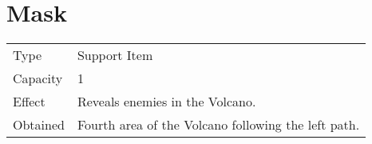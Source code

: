 \section{Mask}
\label{item:mask}


\noindent\begin{tabularx}{\textwidth}[l]{lX}
	Type
	& Support Item
\\ %
	Capacity
	& 1
\\ %
	Effect
	& Reveals enemies in the Volcano.
\\ %
	Obtained
	& Fourth area of the Volcano following the left path.
\end{tabularx}
